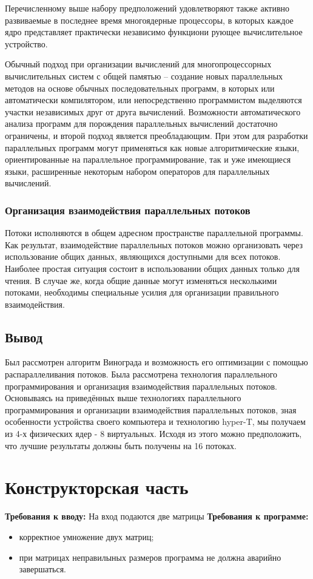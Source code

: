 \documentclass[12pt]{report}
\begin{document}
Перечисленному выше набору предположений удовлетворяют также активно развиваемые в последнее время многоядерные процессоры, в которых каждое ядро представляет практически независимо функциони рующее вычислительное устройство.

Обычный подход при организации вычислений для многопроцессорных вычислительных систем с общей памятью – создание новых параллельных методов на основе обычных последовательных программ, в которых или автоматически компилятором, или непосредственно программистом выделяются участки независимых друг от друга вычислений. Возможности автоматического анализа программ для порождения параллельных вычислений достаточно ограничены, и второй подход является преобладающим. При этом для разработки параллельных программ могут применяться как новые алгоритмические языки, ориентированные на параллельное программирование, так и уже имеющиеся языки, расширенные некоторым набором операторов для параллельных вычислений.


\subsection{Организация взаимодействия параллельных потоков}
Потоки исполняются в общем адресном пространстве параллельной программы. Как результат, взаимодействие параллельных потоков можно организовать через использование общих данных, являющихся доступными для всех потоков. Наиболее простая ситуация состоит в использовании общих данных только для чтения. В случае же, когда общие данные могут изменяться несколькими потоками, необходимы специальные усилия для организации правильного взаимодействия.

\section{Вывод}
Был рассмотрен алгоритм Винограда и возможность его оптимизации с помощью распараллеливания потоков. Была рассмотрена технология параллельного программирования и
организация взаимодействия параллельных потоков. Основываясь на приведённых выше технологиях параллельного программирования и организации взаимодействия параллельных потоков, зная особенности устройства своего компьютера и технологию hyper-T\cite{Microsoft2}, мы получаем из 4-х физических ядер - 8 виртуальных. Исходя из этого можно предположить, что лучшие результаты должны быть получены на 16 потоках.


\chapter{Конструкторская часть}
\textbf{Требования к вводу:}
На вход подаются две матрицы
\newline
\textbf{Требования к программе:}
\begin{itemize}
\item корректное умножение двух матриц;
\item при матрицах неправилыных размеров программа не должна аварийно завершаться.
\end{itemize}
\end{document}
